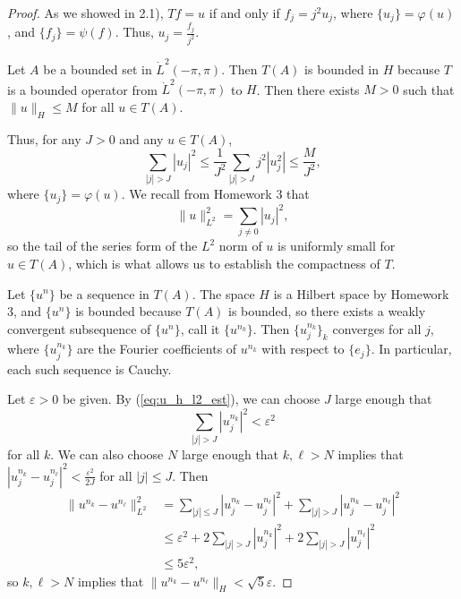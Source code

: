 \documentclass{homework}
\begin{document}
\begin{arabicparts}
\begin{proof}
			As we showed in 2.1), $Tf = u$ if and only if $f_j = j^2u_j$, where $\{u_j\} = \varphi(u)$, and $\{f_j\} = \psi(f)$. Thus, $u_j = \frac{f_j}{j^2}$.
			
			Let $A$ be a bounded set in $\dot{L}^2(-\pi,\pi)$. Then $T(A)$ is bounded in $H$ because $T$ is a bounded operator from $\dot{L}^2(-\pi,\pi)$ to $H$. Then there exists $M > 0$ such that $\lVert u \rVert_H \le M$ for all $u \in T(A)$.
			
			Thus, for any $J > 0$ and any $u \in T(A)$,
			\begin{equation}
				\label{eq:u_h_l2_est}
				\sum_{|j| > J} |u_j|^2 \le \frac{1}{J^2}\sum_{|j|>J}j^2|u_j^2| \le \frac{M}{J^2},
			\end{equation}
			where $\{u_j\} = \varphi(u)$. We recall from Homework 3 that
			\begin{equation}
				\lVert u \rVert_{L^2}^2 = \sum_{j\ne0}|u_j|^2,
			\end{equation}
			so the tail of the series form of the $L^2$ norm of $u$ is uniformly small for $u \in T(A)$, which is what allows us to establish the compactness of $T$.
			
			Let $\{u^n\}$ be a sequence in $T(A)$. The space $H$ is a Hilbert space by Homework 3, and $\{u^n\}$ is bounded because $T(A)$ is bounded, so there exists a weakly convergent subsequence of $\{u^n\}$, call it $\{u^{n_k}\}$. Then $\{u^{n_k}_j\}_k$ converges for all $j$, where $\{u^{n_k}_j\}$ are the Fourier coefficients of $u^{n_k}$ with respect to $\{e_j\}$. In particular, each such sequence is Cauchy.
			
			Let $\varepsilon > 0$ be given. By (\ref{eq:u_h_l2_est}), we can choose $J$ large enough that
			\begin{equation}
				\sum_{|j| > J} |u^{n_k}_j|^2 < \varepsilon^2
			\end{equation}
			for all $k$. We can also choose $N$ large enough that $k,\ell>N$ implies that $|u^{n_k}_j - u^{n_\ell}_j|^2 < \frac{\varepsilon^2}{2J}$ for all $|j| \le J$. Then
			\begin{align}
				\lVert u^{n_k} - u^{n_\ell}\rVert_{L^2}^2 &= \sum_{|j|\le J}|u^{n_k}_j - u^{n_\ell}_j|^2 + \sum_{|j| > J}|u^{n_k}_j - u^{n_\ell}_j|^2 \\
				&\le \varepsilon^2 + 2\sum_{|j|>J}|u^{n_k}_j|^2 + 2\sum_{|j|>J}|u^{n_\ell}_j|^2\\
				&\le 5\varepsilon^2,
			\end{align}
			so $k,\ell > N$ implies that $\lVert u^{n_k} - u^{n_\ell}\rVert_H < \sqrt{5}\varepsilon$.
			

\end{proof}
\end{arabicparts}
\end{document}
